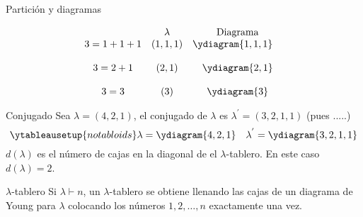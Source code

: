 \documentclass[final,xcolor=svgnames]{beamer}
\begin{document}
\begin{frame}{}
\begin{columns}
\begin{column}{0.5\textwidth}
\begin{block}{Partición y diagramas}
\begin{minipage}{0.5\linewidth}
        \end{minipage}
        \begin{minipage}{0.48\linewidth}
          \begin{equation*}
            \begin{array}{cccc}
              & \lambda  &\mbox{Diagrama} \\ %
              3=1+1+1   &  (1,1,1) & \ydiagram{1,1,1} \quad\\ %
              \\ 3=2+1   &   (2,1)  &\ydiagram{2,1} \\ %
              \\ 3=3     &   (3)    &\ydiagram{3} %
            \end{array}
          \end{equation*}
        \end{minipage}
      \end{block}

      \begin{block}{Conjugado}
        Sea $\lambda=(4,2,1)$, el \alert{conjugado de $\lambda$} 
        es $\lambda^{'}=(3,2,1,1)$ (pues .....)
        \begin{equation*}
          \ytableausetup{notabloids} 
          \lambda=\ydiagram{4,2,1} \quad
          \lambda^{'}=\ydiagram{3,2,1,1}
        \end{equation*}
        $d(\lambda)$ es el número de cajas en la diagonal de el
        $\lambda$-tablero. En este caso $d(\lambda)=2$.
      \end{block}
     
      \begin{block}{$\lambda$-tablero}
        Si $\lambda\vdash n$, un \alert{$\lambda$-tablero} se obtiene llenando las cajas de un diagrama
        de Young para $\lambda$ colocando los números $1,2,\ldots,n$ exactamente
        una vez.
        

\end{block}
\end{column}
\end{columns}
\end{frame}
\end{document}
